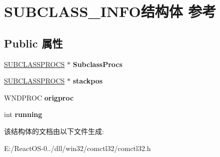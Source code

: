 \hypertarget{struct_s_u_b_c_l_a_s_s___i_n_f_o}{}\section{S\+U\+B\+C\+L\+A\+S\+S\+\_\+\+I\+N\+F\+O结构体 参考}
\label{struct_s_u_b_c_l_a_s_s___i_n_f_o}
\subsection*{Public 属性}
\begin{DoxyCompactItemize}
\item 
\mbox{\label{struct_s_u_b_c_l_a_s_s___i_n_f_o_a95bd7e083b53cd967c55170e5087e8ca}} 
\hyperlink{struct___s_u_b_c_l_a_s_s_p_r_o_c_s}{S\+U\+B\+C\+L\+A\+S\+S\+P\+R\+O\+CS} $\ast$ {\bfseries Subclass\+Procs}
\item 
\mbox{\label{struct_s_u_b_c_l_a_s_s___i_n_f_o_afcc0fe176b9fd707d4f85398ee45d4ba}} 
\hyperlink{struct___s_u_b_c_l_a_s_s_p_r_o_c_s}{S\+U\+B\+C\+L\+A\+S\+S\+P\+R\+O\+CS} $\ast$ {\bfseries stackpos}
\item 
\mbox{\label{struct_s_u_b_c_l_a_s_s___i_n_f_o_ab621128f70d7b1a9365c3f37f8282905}} 
W\+N\+D\+P\+R\+OC {\bfseries origproc}
\item 
\mbox{\label{struct_s_u_b_c_l_a_s_s___i_n_f_o_ae1f6760d0afe8a6cc2d28ae00d1f2d17}} 
int {\bfseries running}
\end{DoxyCompactItemize}


该结构体的文档由以下文件生成\+:\begin{DoxyCompactItemize}
\item 
E\+:/\+React\+O\+S-\/0../dll/win32/comctl32/comctl32.\+h\end{DoxyCompactItemize}
